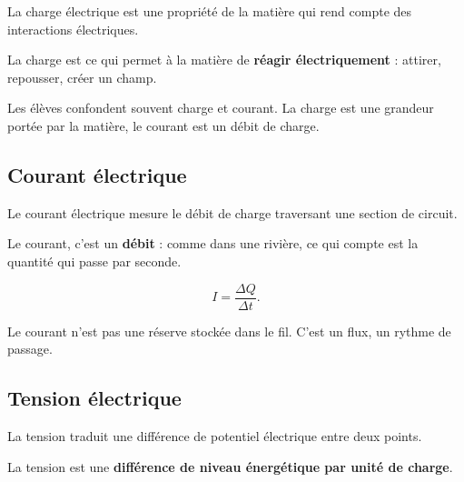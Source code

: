 \documentclass[11pt,a4paper]{article}
\begin{document}
\begin{sens}
La charge électrique est une propriété de la matière qui rend compte des interactions électriques.
\end{sens}

\begin{imagem}
La charge est ce qui permet à la matière de \textbf{réagir électriquement} :
attirer, repousser, créer un champ.
\end{imagem}

\begin{fausseintuition}
Les élèves confondent souvent charge et courant.
La charge est une grandeur portée par la matière, le courant est un débit de charge.
\end{fausseintuition}

\subsection{Courant électrique}

\begin{sens}
Le courant électrique mesure le débit de charge traversant une section de circuit.
\end{sens}

\begin{imagem}
Le courant, c'est un \textbf{débit} :
comme dans une rivière, ce qui compte est la quantité qui passe par seconde.
\end{imagem}

\begin{bilan}
\[
I=\frac{\Delta Q}{\Delta t}.
\]
\end{bilan}

\begin{fausseintuition}
Le courant n'est pas une réserve stockée dans le fil.
C'est un flux, un rythme de passage.
\end{fausseintuition}

\subsection{Tension électrique}

\begin{sens}
La tension traduit une différence de potentiel électrique entre deux points.
\end{sens}

\begin{imagem}
La tension est une \textbf{différence de niveau énergétique par unité de charge}.
\end{imagem}
\end{document}
